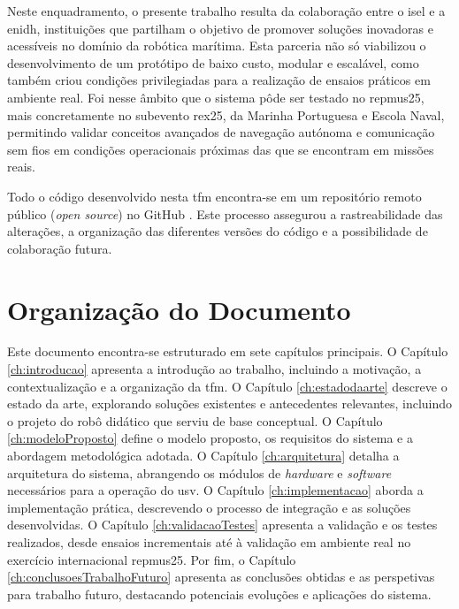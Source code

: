 Neste enquadramento, o presente trabalho resulta da colaboração entre o \gls{isel} e a \gls{enidh}, instituições que partilham o objetivo de promover soluções inovadoras e acessíveis no domínio da robótica marítima. Esta parceria não só viabilizou o desenvolvimento de um protótipo de baixo custo, modular e escalável, como também criou condições privilegiadas para a realização de ensaios práticos em ambiente real. Foi nesse âmbito que o sistema pôde ser testado no \gls{repmus25}, mais concretamente no subevento \gls{rex25}, da Marinha Portuguesa e Escola Naval, permitindo validar conceitos avançados de navegação autónoma e comunicação sem fios em condições operacionais próximas das que se encontram em missões reais.

Todo o código desenvolvido nesta \gls{tfm} encontra-se em um repositório remoto público (\emph{open source}) no GitHub \cite{github-usv}. Este processo assegurou a rastreabilidade das alterações, a organização das diferentes versões do código e a possibilidade de colaboração futura.

\section{Organização do Documento}
\label{sec:organizacao}

Este documento encontra-se estruturado em sete capítulos principais. O Capítulo \ref{ch:introducao} apresenta a introdução ao trabalho, incluindo a motivação, a contextualização e a organização da \gls{tfm}. O Capítulo \ref{ch:estadodaarte} descreve o estado da arte, explorando soluções existentes e antecedentes relevantes, incluindo o projeto do robô didático que serviu de base conceptual. O Capítulo \ref{ch:modeloProposto} define o modelo proposto, os requisitos do sistema e a abordagem metodológica adotada. O Capítulo \ref{ch:arquitetura} detalha a arquitetura do sistema, abrangendo os módulos de \emph{hardware} e \emph{software} necessários para a operação do \gls{usv}. O Capítulo \ref{ch:implementacao} aborda a implementação prática, descrevendo o processo de integração e as soluções desenvolvidas. O Capítulo \ref{ch:validacaoTestes} apresenta a validação e os testes realizados, desde ensaios incrementais até à validação em ambiente real no exercício internacional \gls{repmus25}. Por fim, o Capítulo \ref{ch:conclusoesTrabalhoFuturo} apresenta as conclusões obtidas e as perspetivas para trabalho futuro, destacando potenciais evoluções e aplicações do sistema.
